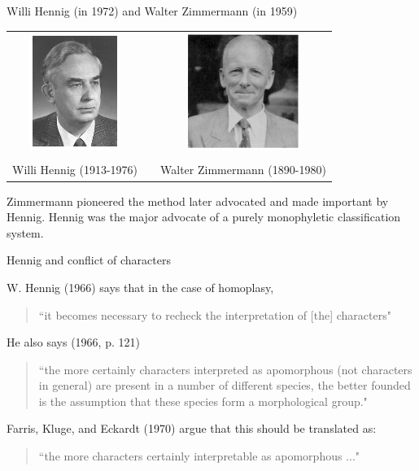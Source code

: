 \documentclass[bluish,slideColor,colorBG,pdf]{prosper}
\begin{document}
\begin{slide}[Replace]{Willi Hennig (in 1972) and Walter Zimmermann (in 1959) }
\bigskip

\begin{center}
\begin{tabular}{c c c}
\includegraphics[height=1.5in]{Hennig3.ps} & \hspace{0.1in} &
\includegraphics[height=1.5in]{Zimmermann1959.ps} \\
 & & \\
Willi Hennig (1913-1976) & & Walter Zimmermann (1890-1980) \\
\end{tabular}
\end{center}
\bigskip

Zimmermann pioneered the method later advocated and made important by Hennig.
Hennig was the major advocate of a purely monophyletic classification system.

\end{slide}

\begin{slide}[Replace]{Hennig and conflict of characters}

W. Hennig (1966) says that in the case of homoplasy,

\begin{quote}
``it becomes necessary
to recheck the interpretation of [the] characters"
\end{quote}

He also says (1966, p. 121)

\begin{quote}
``the more certainly characters interpreted
as apomorphous (not characters in general) are present in a number of
different species, the better founded is the assumption that these species
form a morphological group."
\end{quote}

Farris, Kluge, and Eckardt (1970) argue that this should be translated as:

\begin{quote}
``the more characters certainly interpretable as apomorphous ..."
\end{quote}

\end{slide}
\end{document}
